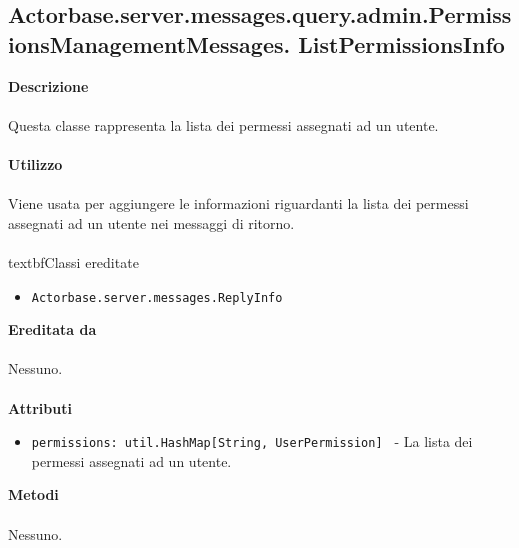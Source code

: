 \documentclass[a4paper]{article}
\begin{document}
	\subsection{Actorbase.server.messages.query.admin.PermissionsManagementMessages.
	\newline ListPermissionsInfo}
		\textbf{Descrizione}
			\\ \\
			Questa classe rappresenta la lista dei permessi assegnati ad un utente.
			\\ \\
		\textbf{Utilizzo}
			\\ \\
			Viene usata per aggiungere le informazioni riguardanti la lista dei permessi assegnati ad un utente nei messaggi di ritorno.
			\\ \\
		textbf{Classi ereditate}
			\begin{itemize}
				\item \texttt{Actorbase.server.messages.ReplyInfo}
			\end{itemize}
		\textbf{Ereditata da}
			\\ \\
			Nessuno.
			\\ \\
		\textbf{Attributi}
			\begin{itemize}
				\item \texttt{permissions: util.HashMap[String, UserPermission] } - La lista dei permessi assegnati ad un utente.
			\end{itemize}
		\textbf{Metodi}
			\\ \\
			Nessuno.
	
\end{document}

